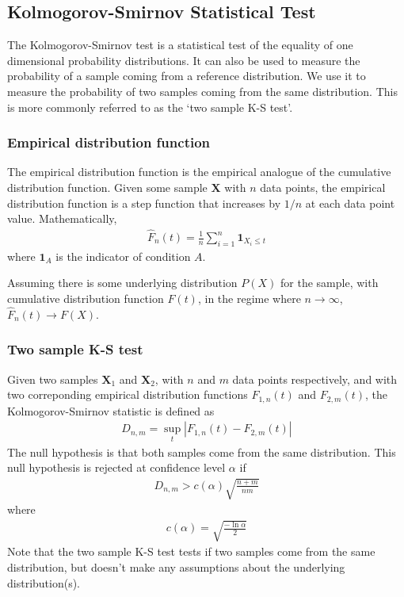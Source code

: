 \documentclass[a4paper,12pt]{article}
\theoremstyle{definition}
\begin{document}
\subsection{Kolmogorov-Smirnov Statistical Test}\label{sec:ks_test}
The Kolmogorov-Smirnov test is a statistical test of the equality of one dimensional probability distributions. It can also be used to measure the probability of a sample coming from a reference distribution. We use it to measure the probability of two samples coming from the same distribution. This is more commonly referred to as the `two sample K-S test'.

\subsubsection{Empirical distribution function}
The empirical distribution function is the empirical analogue of the cumulative distribution function. Given some sample $\mathbf{X}$ with $n$ data points, the empirical distribution function is a step function that increases by $1/n$ at each data point value. Mathematically,
\begin{align}
  \hat{F}_{n}(t) = \frac{1}{n} \sum_{i=1}^n \mathbf{1}_{X_i \leq t}
\end{align}
where $\mathbf{1}_{A}$ is the indicator of condition $A$.

Assuming there is some underlying distribution $P(X)$ for the sample, with cumulative distribution function $F(t)$, in the regime where $n \rightarrow \infty$, $\hat{F}_n (t) \rightarrow F(X)$.

\subsubsection{Two sample K-S test}
Given two samples $\mathbf{X}_1$ and $\mathbf{X}_2$, with $n$ and $m$ data points respectively, and with two correponding empirical distribution functions $F_{1,n}(t)$ and $F_{2,m}(t)$, the Kolmogorov-Smirnov statistic is defined as
\begin{align}
  D_{n,m} = \sup_{t} |F_{1,n}(t) - F_{2,m}(t)|
\end{align}
The null hypothesis is that both samples come from the same distribution. This null hypothesis is rejected at confidence level $\alpha$ if
\begin{align}
  D_{n,m} > c(\alpha)\sqrt{\frac{n+m}{nm}}
\end{align}
where
\begin{align}
  c(\alpha) = \sqrt{\frac{-\ln \alpha}{2}}
\end{align}
Note that the two sample K-S test tests if two samples come from the same distribution, but doesn't make any assumptions about the underlying distribution(s).
\end{document}
